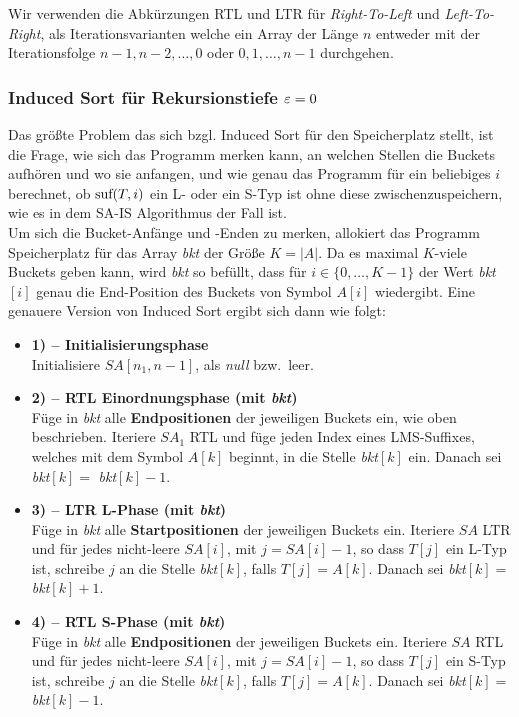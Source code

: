 Wir verwenden die Abkürzungen RTL und LTR für \textit{Right-To-Left} und \textit{Left-To-Right}, als Iterationsvarianten welche ein Array der Länge $n$ entweder mit der Iterationsfolge $n-1, n-2, \ldots, 0$ oder $0, 1, \ldots, n - 1$ durchgehen. 

\subsubsection{ Induced Sort für Rekursionstiefe $\varepsilon = 0$}

Das größte Problem das sich bzgl. Induced Sort für den Speicherplatz stellt, ist die Frage, wie sich das Programm merken kann, an welchen Stellen die Buckets aufhören und wo sie anfangen, und wie genau das Programm für ein beliebiges $i$ berechnet, ob $\text{suf}(T,i)$ ein L- oder ein S-Typ ist ohne diese zwischenzuspeichern, wie es in dem SA-IS Algorithmus der Fall ist. \\

Um sich die Bucket-Anfänge und -Enden zu merken, allokiert das Programm Speicherplatz für das Array \textit{bkt}  der Größe $K = |A|$. Da es maximal $K$-viele Buckets geben kann, wird \textit{bkt} so befüllt, dass für $i \in \{0, \ldots, K-1\}$ der Wert \textit{bkt}$[i]$ genau die End-Position des Buckets von Symbol $A[i]$ wiedergibt. Eine genauere Version von Induced Sort ergibt sich dann wie folgt:
\begin{itemize}
\item \textbf{1) -- Initialisierungsphase} \\
Initialisiere $SA[n_1, n-1]$, als \textit{null} bzw.\ leer.

\item \textbf{2) -- RTL Einordnungsphase (mit \textit{bkt})} \\
Füge in \textit{bkt}  alle \textbf{Endpositionen} der jeweiligen Buckets ein, wie oben beschrieben. Iteriere $SA_1$ RTL und füge jeden Index eines LMS-Suffixes, welches mit dem Symbol $A[k]$ beginnt, in die Stelle \textit{bkt}$[k]$ ein. Danach sei \textit{bkt}$[k] = $ \textit{bkt}$[k]-1$.

\item \textbf{3) -- LTR L-Phase (mit \textit{bkt})} \\
Füge in \textit{bkt}  alle \textbf{Startpositionen} der jeweiligen Buckets ein. Iteriere $SA$ LTR und für jedes nicht-leere $SA[i]$, mit $j = SA[i]-1$, so dass $T[j]$ ein L-Typ ist, schreibe $j$ an die Stelle \textit{bkt}$[k]$, falls $T[j] = A[k]$. Danach sei \textit{bkt}$[k] = $ \textit{bkt}$[k]+1$.

\item \textbf{4) -- RTL S-Phase (mit \textit{bkt})} \\
Füge in \textit{bkt}  alle \textbf{Endpositionen} der jeweiligen Buckets ein. Iteriere $SA$ RTL und für jedes nicht-leere $SA[i]$, mit $j = SA[i]-1$, so dass $T[j]$ ein S-Typ ist, schreibe $j$ an die Stelle \textit{bkt}$[k]$, falls $T[j] = A[k]$. Danach sei \textit{bkt}$[k] = $ \textit{bkt}$[k]-1$.
\end{itemize}


